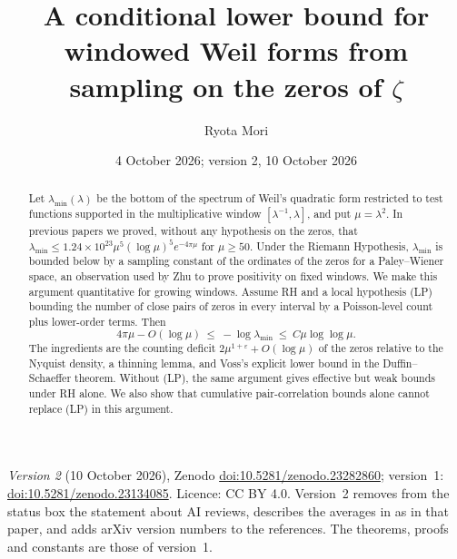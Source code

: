 \documentclass[11pt]{amsart}
\title[A conditional lower bound for windowed Weil forms]{A conditional lower bound for windowed Weil forms from sampling on the zeros of $\zeta$}
\author{Ryota Mori}
\date{4 October 2026; version 2, 10 October 2026}
\newcommand{\doi}[1]{\href{https://doi.org/#1}{doi:#1}}
\theoremstyle{definition}
\theoremstyle{remark}
\numberwithin{equation}{section}
\begin{document}
\begin{abstract}
Let $\lambda_{\min}(\lambda)$ be the bottom of the spectrum of Weil's quadratic form restricted to test functions supported in the multiplicative window $[\lambda^{-1},\lambda]$, and put $\mu=\lambda^2$. In previous papers we proved, without any hypothesis on the zeros, that $\lambda_{\min}\le1.24\times10^{23}\mu^5(\log\mu)^5e^{-4\pi\mu}$ for $\mu\ge50$. Under the Riemann Hypothesis, $\lambda_{\min}$ is bounded below by a sampling constant of the ordinates of the zeros for a Paley--Wiener space, an observation used by Zhu to prove positivity on fixed windows. We make this argument quantitative for growing windows. Assume RH and a local hypothesis (LP) bounding the number of close pairs of zeros in every interval by a Poisson-level count plus lower-order terms. Then
\[
4\pi\mu-O(\log\mu)\ \le\ -\log\lambda_{\min}\ \le\ C\mu\log\log\mu .
\]
The ingredients are the counting deficit $2\mu^{1+\varepsilon}+O(\log\mu)$ of the zeros relative to the Nyquist density, a thinning lemma, and Voss's explicit lower bound in the Duffin--Schaeffer theorem. Without (LP), the same argument gives effective but weak bounds under RH alone. We also show that cumulative pair-correlation bounds alone cannot replace (LP) in this argument.
\end{abstract}

\maketitle

\begin{sloppypar}
\noindent\textit{Version 2} (10 October 2026), Zenodo \doi{10.5281/zenodo.23282860}; version~1: \doi{10.5281/zenodo.23134085}. Licence: CC BY 4.0. Version~2 removes from the status box the statement about AI reviews, describes the averages in \cite{CGdL20} as in that paper, and adds arXiv version numbers to the references. The theorems, proofs and constants are those of version~1.
\end{sloppypar}


\begin{center}
\end{center}
\end{document}
